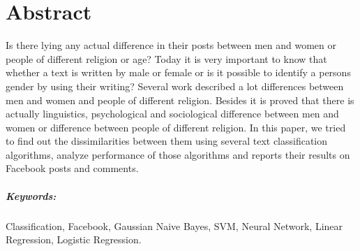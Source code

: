 \documentclass{standalone}
\begin{document}
\chapter*{Abstract}
Is there lying any actual difference in their posts between men and women or people of different religion or age? Today it is very important to know that whether a text is written by male or female or is it possible to identify a persons gender by using their writing? Several work described a lot differences between men and women and people of different religion. Besides it is proved that there is actually linguistics, psychological and sociological difference between men and women or difference between people of different religion. In this paper, we tried to find out the dissimilarities between them using several text classification algorithms, analyze performance of those algorithms and reports their results on Facebook posts and comments.

\paragraph*{Keywords:}  Classification, Facebook, Gaussian Naive Bayes, SVM, Neural Network, Linear Regression, Logistic Regression.
\end{document}
